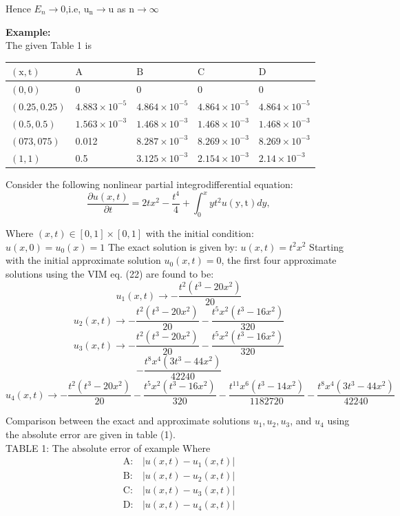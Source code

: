 \documentclass[12pt, a4paper]{report}
\begin{document}
Hence $E_n \rightarrow 0$,i.e, $\mathrm{u}_{\mathrm{n}} \longrightarrow \mathrm{u}$ as $\mathrm{n} \longrightarrow \infty$

\clearpage

\textbf{\Large Example:}\\ 
The given Table 1 is \\
\begin{tabular}{|l|l|l|l|l|}
\hline$(\mathrm{x}, \mathrm{t})$ & $\mathrm{A}$ & $\mathrm{B}$ & $\mathrm{C}$ & $\mathrm{D}$ \\
\hline$(0,0)$ & 0 & 0 & 0 & 0 \\
\hline$(0.25,0.25)$ & $4.883 \times 10^{-5}$ & $4.864 \times 10^{-5}$ & $4.864 \times 10^{-5}$ & $4.864 \times 10^{-5}$ \\
\hline$(0.5,0.5)$ & $1.563 \times 10^{-3}$ & $1.468 \times 10^{-3}$ & $1.468 \times 10^{-3}$ & $1.468 \times 10^{-3}$ \\
\hline$(073,075)$ & 0.012 & $8.287 \times 10^{-3}$ & $8.269 \times 10^{-3}$ & $8.269 \times 10^{-3}$ \\
\hline$(1,1)$ & 0.5 & $3.125 \times 10^{-3}$ & $2.154 \times 10^{-3}$ & $2.14 \times 10^{-3}$ \\
\hline
\end{tabular}

Consider the following nonlinear partial integrodifferential equation:
$$
\frac{\partial u(x, t)}{\partial t}=2 t x^2-\frac{t^4}{4}+\int_0^x y t^2 u(\mathrm{y}, \mathrm{t}) d y,
$$

Where $(x, t) \in[0,1] \times[0,1]$
with the initial condition:
$u(x, 0)=u_0(x)=1$
The exact solution is given by:
$u(x, t)=t^2 x^2$
Starting with the initial approximate solution $u_0(x, t)=0$, the first four approximate solutions using the VIM eq. (22) are found to be:
\[
u_1(x, t) \rightarrow-\frac{t^2\left(t^3-20 x^2\right)}{20}
\]
\[u_2(x, t) \rightarrow-\frac{t^2\left(t^3-20 x^2\right)}{20}-\frac{t^5 x^2\left(t^3-16 x^2\right)}{320}\]
\[u_3(x, t) \rightarrow-\frac{t^2\left(t^3-20 x^2\right)}{20}-\frac{t^5 x^2\left(t^3-16 x^2\right)}{320}\]
\[-\frac{t^8 x^4\left(3 t^3-44 x^2\right)}{42240}\]
\[
u_4(x, t) \rightarrow-\frac{t^2\left(t^3-20 x^2\right)}{20}-\frac{t^5 x^2\left(t^3-16 x^2\right)}{320}
-\frac{t^{11} x^6\left(t^3-14 x^2\right)}{1182720}-\frac{t^8 x^4\left(3 t^3-44 x^2\right)}{42240}
\]

Comparison between the exact and approximate solutions $u_1, u_2, u_3$, and $u_4$ using the absolute error are given in table (1).\\
TABLE 1: The absolute error of example 
Where 
\[
\begin{array}{ll}
\mathrm{A}: & \left|u(x, t)-u_1(x, t)\right| \\
\mathrm{B}: & \left|u(x, t)-u_2(x, t)\right| \\
\mathrm{C}: & \left|u(x, t)-u_3(x, t)\right| \\
\mathrm{D}: & \left|u(x, t)-u_4(x, t)\right|
\end{array}
\]
\end{document}
